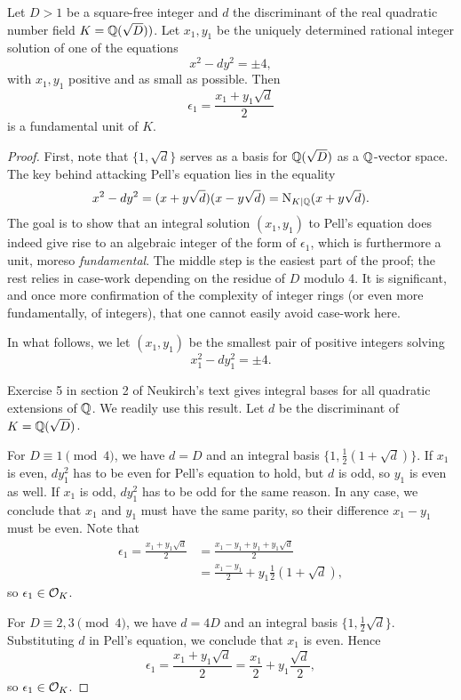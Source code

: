 \begin{prop}
	Let $D>1$ be a square-free integer and $d$ the discriminant of the real quadratic number field $K=\mathbb{Q}(\sqrt{D}))$. Let $x_1,y_1$ be the uniquely determined rational integer solution of one of the equations
	\[
		x^2-dy^2=\pm 4,
	\]
	with $x_1,y_1$ positive and as small as possible. Then
	\[
		\epsilon_1 = \frac{x_1+y_1\sqrt{d}}{2}
	\]
	is a fundamental unit of $K$.
\end{prop}
\begin{proof}
	First, note that $\{1,\sqrt{d}\}$ serves as a basis for $\mathbb{Q}(\sqrt{D})$ as a $\mathbb{Q}$-vector space. The key behind attacking Pell's equation lies in the equality
	\[
		x^2-dy^2 = (x+y\sqrt{d})(x-y\sqrt{d}) = \operatorname{N}_{K\mid\mathbb{Q}}(x+y\sqrt{d}).
	\]
	The goal is to show that an integral solution $(x_1,y_1)$ to Pell's equation does indeed give rise to an algebraic integer of the form of $\epsilon_1$, which is furthermore a unit, moreso \emph{fundamental}. The middle step is the easiest part of the proof; the rest relies in case-work depending on the residue of $D$ modulo 4. It is significant, and once more confirmation of the complexity of integer rings (or even more fundamentally, of integers), that one cannot easily avoid case-work here.

	In what follows, we let $(x_1,y_1)$ be the smallest pair of positive integers solving
	\[
		x_1^2-dy_1^2 = \pm 4.
	\]

	Exercise 5 in section 2 of Neukirch's text gives integral bases for all quadratic extensions of $\mathbb{Q}$. We readily use this result. Let $d$ be the discriminant of $K=\mathbb{Q}(\sqrt{D})$.

	For $D\equiv 1 \pmod{4}$, we have $d=D$ and an integral basis $\{1,\frac{1}{2}(1+\sqrt{d})\}$. If $x_1$ is even, $dy_1^2$ has to be even for Pell's equation to hold, but $d$ is odd, so $y_1$ is even as well. If $x_1$ is odd, $dy_1^2$ has to be odd for the same reason. In any case, we conclude that $x_1$ and $y_1$ must have the same parity, so their difference $x_1-y_1$ must be even. Note that
	\begin{align*}
		\epsilon_1 = \frac{x_1+y_1\sqrt{d}}{2} &= \frac{x_1-y_1+y_1+y_1\sqrt{d}}{2}\\
			&= \frac{x_1-y_1}{2} + y_1\frac{1}{2}\left(1+\sqrt{d}\right),
	\end{align*}
	so $\epsilon_1\in\mathcal{O}_K$.

	For $D\equiv 2,3 \pmod{4}$, we have $d=4D$ and an integral basis $\{1,\frac{1}{2}\sqrt{d}\}$. Substituting $d$ in Pell's equation, we conclude that $x_1$ is even. Hence
	\[
		\epsilon_1 = \frac{x_1+y_1\sqrt{d}}{2} = \frac{x_1}{2} + y_1\frac{\sqrt{d}}{2},
	\]
	so $\epsilon_1\in\mathcal{O}_K$.


\end{proof}

